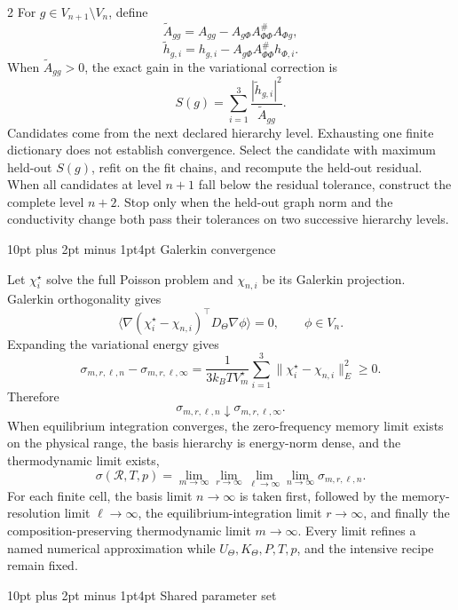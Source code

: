 \documentclass[10pt]{article}
\makeatletter
\renewcommand\section{\@startsection{section}{1}{0pt}%
  {10pt plus 2pt minus 1pt}{4pt}%
  {\large\sffamily\bfseries\color{lithioxfontgreen}}}
\newcommand{\pinv}{^{\#}}
\makeatother
\begin{document}
\begin{multicols}{2}
For \(g\in V_{n+1}\setminus V_n\), define
\[
\widetilde A_{gg}
=A_{gg}-A_{g\Phi}A_{\Phi\Phi}\pinv A_{\Phi g},
\]
\[
\widetilde h_{g,i}
=h_{g,i}-A_{g\Phi}A_{\Phi\Phi}\pinv h_{\Phi,i}.
\]
When \(\widetilde A_{gg}>0\), the exact gain in the variational correction is
\[
S(g)=\sum_{i=1}^3
\frac{|\widetilde h_{g,i}|^2}{\widetilde A_{gg}}.
\]
Candidates come from the next declared hierarchy level. Exhausting one finite
dictionary does not establish convergence.  Select the candidate with maximum
held-out \(S(g)\), refit on the fit chains, and recompute the held-out residual.
When all candidates at level \(n+1\) fall below the residual tolerance, construct
the complete level \(n+2\).  Stop only when the held-out graph norm and the
conductivity change both pass their tolerances on two successive hierarchy levels.

\section{Galerkin convergence}

Let \(\chi_i^\star\) solve the full Poisson problem and \(\chi_{n,i}\) be its Galerkin
projection. Galerkin orthogonality gives
\[
\langle\nabla(\chi_i^\star-\chi_{n,i})^\top
D_\Theta\nabla\phi\rangle=0,\qquad \phi\in V_n.
\]
Expanding the variational energy gives
\[
\boxed{
\sigma_{m,r,\ell,n}-\sigma_{m,r,\ell,\infty}
=\frac{1}{3k_BTV_m^\star}
\sum_{i=1}^3\|\chi_i^\star-\chi_{n,i}\|_E^2\ge0.}
\]
Therefore
\[
\sigma_{m,r,\ell,n}\downarrow\sigma_{m,r,\ell,\infty}.
\]
When equilibrium integration converges, the zero-frequency memory limit exists on the
physical range, the basis hierarchy is energy-norm dense, and the thermodynamic limit
exists,
\[
\boxed{
\sigma(\mathcal R,T,p)=
\lim_{m\to\infty}\lim_{r\to\infty}
\lim_{\ell\to\infty}\lim_{n\to\infty}
\sigma_{m,r,\ell,n}.}
\]
For each finite cell, the basis limit \(n\to\infty\) is taken first, followed by
the memory-resolution limit \(\ell\to\infty\), the equilibrium-integration limit
\(r\to\infty\), and finally the composition-preserving thermodynamic limit
\(m\to\infty\).
Every limit refines a named numerical approximation while
\(U_\Theta,K_\Theta,P,T,p\), and the intensive recipe remain fixed.

\section{Shared parameter set}


\end{multicols}
\end{document}

